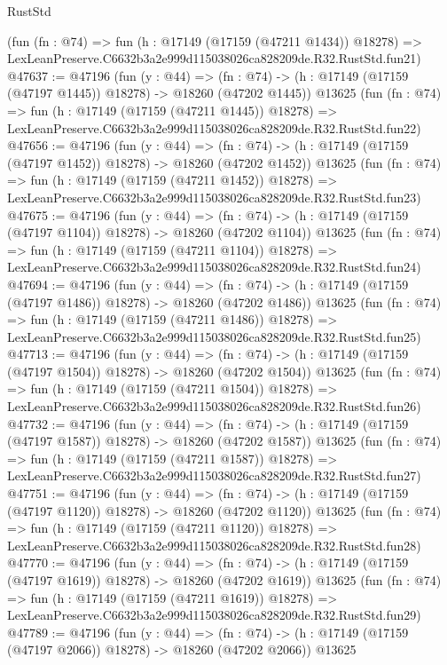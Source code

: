 \begin{lexlean}{RustStd}
\begin{coremodule}
    (fun (fn : @74) =>
    fun (h : @17149 (@17159 (@47211 @1434)) @18278) =>
    LexLeanPreserve.C6632b3a2e999d115038026ca828209de.R32.RustStd.fun21)
@47637 := @47196
    (fun (y : @44) =>
    (fn : @74) -> (h : @17149 (@17159 (@47197 @1445)) @18278) -> @18260 (@47202 @1445))
    @13625
    (fun (fn : @74) =>
    fun (h : @17149 (@17159 (@47211 @1445)) @18278) =>
    LexLeanPreserve.C6632b3a2e999d115038026ca828209de.R32.RustStd.fun22)
@47656 := @47196
    (fun (y : @44) =>
    (fn : @74) -> (h : @17149 (@17159 (@47197 @1452)) @18278) -> @18260 (@47202 @1452))
    @13625
    (fun (fn : @74) =>
    fun (h : @17149 (@17159 (@47211 @1452)) @18278) =>
    LexLeanPreserve.C6632b3a2e999d115038026ca828209de.R32.RustStd.fun23)
@47675 := @47196
    (fun (y : @44) =>
    (fn : @74) -> (h : @17149 (@17159 (@47197 @1104)) @18278) -> @18260 (@47202 @1104))
    @13625
    (fun (fn : @74) =>
    fun (h : @17149 (@17159 (@47211 @1104)) @18278) =>
    LexLeanPreserve.C6632b3a2e999d115038026ca828209de.R32.RustStd.fun24)
@47694 := @47196
    (fun (y : @44) =>
    (fn : @74) -> (h : @17149 (@17159 (@47197 @1486)) @18278) -> @18260 (@47202 @1486))
    @13625
    (fun (fn : @74) =>
    fun (h : @17149 (@17159 (@47211 @1486)) @18278) =>
    LexLeanPreserve.C6632b3a2e999d115038026ca828209de.R32.RustStd.fun25)
@47713 := @47196
    (fun (y : @44) =>
    (fn : @74) -> (h : @17149 (@17159 (@47197 @1504)) @18278) -> @18260 (@47202 @1504))
    @13625
    (fun (fn : @74) =>
    fun (h : @17149 (@17159 (@47211 @1504)) @18278) =>
    LexLeanPreserve.C6632b3a2e999d115038026ca828209de.R32.RustStd.fun26)
@47732 := @47196
    (fun (y : @44) =>
    (fn : @74) -> (h : @17149 (@17159 (@47197 @1587)) @18278) -> @18260 (@47202 @1587))
    @13625
    (fun (fn : @74) =>
    fun (h : @17149 (@17159 (@47211 @1587)) @18278) =>
    LexLeanPreserve.C6632b3a2e999d115038026ca828209de.R32.RustStd.fun27)
@47751 := @47196
    (fun (y : @44) =>
    (fn : @74) -> (h : @17149 (@17159 (@47197 @1120)) @18278) -> @18260 (@47202 @1120))
    @13625
    (fun (fn : @74) =>
    fun (h : @17149 (@17159 (@47211 @1120)) @18278) =>
    LexLeanPreserve.C6632b3a2e999d115038026ca828209de.R32.RustStd.fun28)
@47770 := @47196
    (fun (y : @44) =>
    (fn : @74) -> (h : @17149 (@17159 (@47197 @1619)) @18278) -> @18260 (@47202 @1619))
    @13625
    (fun (fn : @74) =>
    fun (h : @17149 (@17159 (@47211 @1619)) @18278) =>
    LexLeanPreserve.C6632b3a2e999d115038026ca828209de.R32.RustStd.fun29)
@47789 := @47196
    (fun (y : @44) =>
    (fn : @74) -> (h : @17149 (@17159 (@47197 @2066)) @18278) -> @18260 (@47202 @2066))
    @13625

\end{coremodule}
\end{lexlean}

